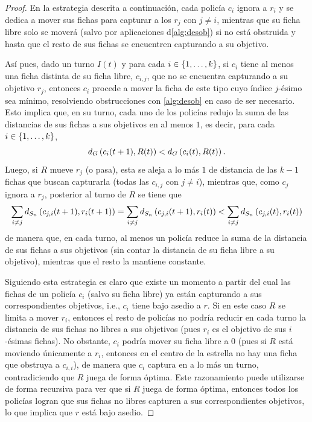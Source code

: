 \begin{proof}
    En la estrategia descrita a continuaci\'on, cada polic\'ia $c_i$ ignora a
    $r_i$ y se dedica a mover sus fichas para capturar a los $r_j$ con $j\neq
    i$, mientras que su ficha libre solo se mover\'a (salvo por aplicaciones
    d\cref{alg:desob}) si no est\'a obstruida y hasta que el resto de sus fichas
    se encuentren capturando a su objetivo.

    As\'i pues, dado un turno $I(t)$ y para cada $i\in\{1,\dots, k\}$, si $c_i$
    tiene al menos una ficha distinta de su ficha libre, $c_{i,j}$, que no se
    encuentra capturando a su objetivo $r_j$, entonces $c_i$ procede a mover la
    ficha de este tipo cuyo \'indice $j$-\'esimo sea m\'inimo, resolviendo
    obstrucciones con \cref{alg:desob} en caso de ser necesario. Esto implica
    que, en su turno, cada uno de los polic\'ias redujo la suma de las
    distancias de sus fichas a sus objetivos en al menos $1$, es decir, para
    cada $i\in\{1,\dots, k\}$,
    \[
        d_{G}\left( c_i(t+1),R(t)\right)< d_{G} \left( c_i(t),R(t)\right).
    \]
    Luego, si $R$ mueve $r_j$ (o pasa), esta se aleja a lo m\'as $1$ de
    distancia de las $k-1$ fichas que buscan capturarla (todas las $c_{i,j}$ con
    $j\neq i$), mientras que, como $c_j$ ignora a $r_j$, posterior al turno de
    $R$ se tiene que
    \[
        \sum_{i\neq j} d_{S_n}\left( c_{j,i}(t+1),r_i(t+1)\right) = \sum_{i\neq j} 
        d_{S_n}\left( c_{j,i}(t+1),r_i(t)\right) < \sum_{i\neq j} d_{S_n}
        \left( c_{j,i}(t),r_i(t)\right)
    \]
    de manera que, en cada turno, al menos un polic\'ia reduce la suma de la
    distancia de sus fichas a sus objetivos (sin contar la distancia de su ficha
    libre a su objetivo), mientras que el resto la mantiene constante.

    Siguiendo esta estrategia es claro que existe un momento a partir del cual
    las fichas de un polic\'ia $c_i$ (salvo su ficha libre) ya est\'an
    capturando a sus correspondientes objetivos, i.e., $c_i$ tiene bajo asedio a
    $r$. Si en este caso $R$ se limita a mover $r_i$, entonces el resto de
    polic\'ias no podr\'ia reducir en cada turno la distancia de sus fichas no
    libres a sus objetivos (pues $r_i$ es el objetivo de sus $i$-\'esimas
    fichas). No obstante, $c_i$ podr\'ia mover su ficha libre a $0$ (pues si $R$
    est\'a moviendo \'unicamente a $r_i$, entonces en el centro de la estrella
    no hay una ficha que obstruya a $c_{i,i}$), de manera que $c_i$ captura en a
    lo m\'as un turno, contradiciendo que $R$ juega de forma \'optima. Este
    razonamiento puede utilizarse de forma recursiva para ver que si $R$ juega
    de forma \'optima, entonces todos los polic\'ias logran que sus fichas no
    libres capturen a sus correspondientes objetivos, lo que implica que $r$
    est\'a bajo asedio.

\end{proof}

